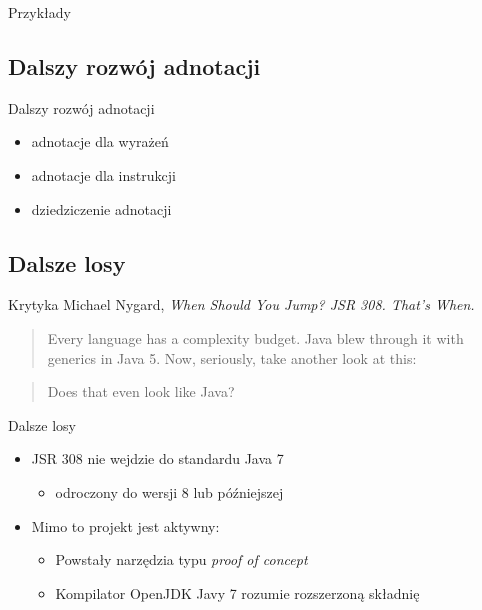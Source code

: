 \documentclass{beamer}
\begin{document}
\begin{frame}{Przykłady}
  
  
\end{frame}

\subsection{Dalszy rozwój adnotacji}

\begin{frame}{Dalszy rozwój adnotacji}
  \begin{itemize}
  \item<1-> adnotacje dla wyrażeń
  \item<2-> adnotacje dla instrukcji
  \item<3-> dziedziczenie adnotacji
  \end{itemize}
\end{frame}

\subsection{Dalsze losy}

\begin{frame}{Krytyka}
  Michael Nygard, \emph{When Should You Jump? JSR 308. That's When.}
  \pause
  \begin{quote}
Every language has a complexity budget. Java blew through it with
generics in Java 5. Now, seriously, take another look at this:
  \end{quote}
  
  \begin{quote}
    Does that even look like Java? 
  \end{quote}
\end{frame}

\begin{frame}{Dalsze losy}
  \begin{itemize}
  \item<1-> JSR 308 nie wejdzie do standardu Java 7 
    \begin{itemize}
    \item odroczony do wersji 8 lub późniejszej
    \end{itemize}
  \item<2-> Mimo to projekt jest aktywny:
    \begin{itemize}
    \item Powstały narzędzia typu \emph{proof of concept}
    \item Kompilator OpenJDK Javy 7 rozumie rozszerzoną składnię
    \end{itemize}
  \end{itemize}
\end{frame}
\end{document}

